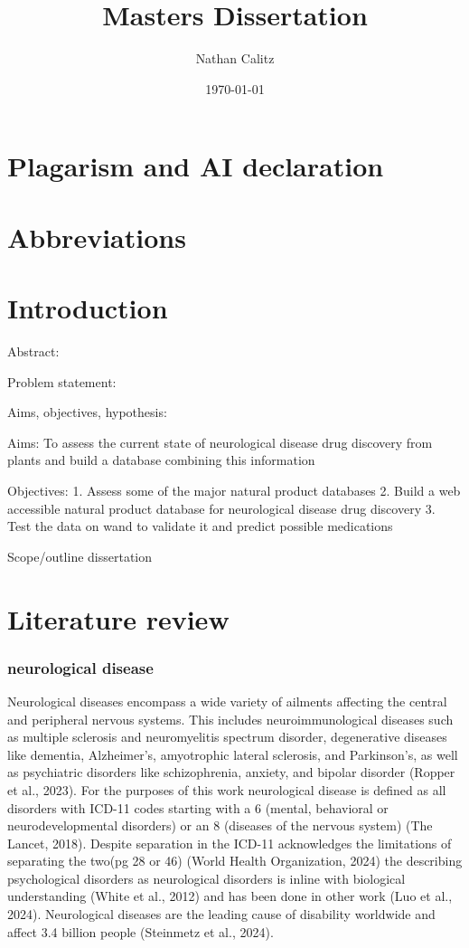 \documentclass[11pt,a4paper]{report}
\title{Masters Dissertation}
\author{Nathan Calitz}
\date{\today}
\begin{document}
\maketitle
{}
\chapter*{Plagarism and AI declaration}

\chapter*{Abbreviations}

\tableofcontents
\clearpage
{}

\chapter{Introduction}

Abstract:

Problem statement:

Aims, objectives, hypothesis:

Aims: To assess the current state of neurological disease drug discovery from plants and build a database combining this information

Objectives:
1. Assess some of the major natural product databases
2. Build a web accessible natural product database for neurological disease drug discovery
3. Test the data on wand to validate it and predict possible medications

Scope/outline dissertation

\chapter{Literature review}
\subsection{neurological disease}
Neurological diseases encompass a wide variety of ailments affecting the central and peripheral nervous systems. This includes neuroimmunological diseases such as multiple sclerosis and neuromyelitis spectrum disorder, degenerative diseases like dementia, Alzheimer’s, amyotrophic lateral sclerosis, and Parkinson’s, as well as psychiatric disorders like schizophrenia, anxiety, and bipolar disorder (Ropper et al., 2023). For the purposes of this work neurological disease is defined as all disorders with ICD-11 codes starting with a 6 (mental, behavioral or neurodevelopmental disorders) or an 8 (diseases of the nervous system) (The Lancet, 2018). Despite separation in the ICD-11 acknowledges the limitations of separating the two(pg 28 or 46) (World Health Organization, 2024) the describing psychological disorders as neurological disorders is inline with biological understanding (White et al., 2012) and has been done in other work (Luo et al., 2024).
Neurological diseases are the leading cause of disability worldwide and affect 3.4 billion people (Steinmetz et al., 2024).
\end{document}
